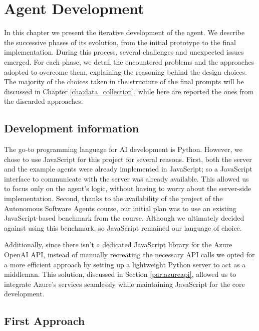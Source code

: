 \chapter{Agent Development}
\label{cha:agent_development}

In this chapter we present the iterative development of the agent. We describe the
successive phases of its evolution, from the initial prototype to the final
implementation. During this process, several challenges and unexpected issues
emerged. For each phase, we detail the encountered problems and the approaches
adopted to overcome them, explaining the reasoning behind the design choices.
The majority of the choices taken in the structure of the final prompts will be
discussed in Chapter \ref{cha:data_collection}, while here are reported the ones
from the discarded approaches.

\section{Development information}
\label{sec:development_information}

The go-to programming language for AI development is Python. However, we chose
to use JavaScript for this project for several reasons. First, both the server
and the example agents were already implemented in JavaScript; so a JavaScript interface
to communicate with the server was already available. This allowed us to focus
only on the agent's logic, without having to worry about the server-side implementation.
Second, thanks to the availability of the project of the Autonomous Software Agents
course, our initial plan was to use an existing JavaScript-based benchmark from
the course. Although we ultimately decided against using this benchmark, so
JavaScript remained our language of choice.

Additionally, since there isn't a dedicated JavaScript library for the Azure OpenAI
API, instead of manually recreating the necessary API calls we opted for a more
efficient approach by setting up a lightweight Python server to act as a
middleman. This solution, discussed in Section \ref{par:azureapi}, allowed us to
integrate Azure's services seamlessly while maintaining JavaScript for the core development.

\section{First Approach}
\label{sec:first_approach}

